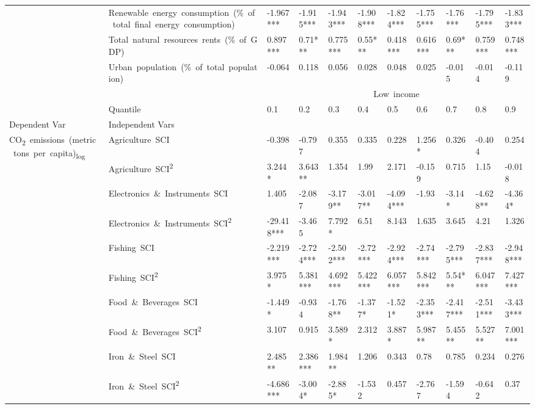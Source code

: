 \documentclass[10pt]{article}
\begin{document}
\begin{table}[H]
\begin{adjustbox}{width=\textwidth,center}
\begin{tabular}{lllllllllll}
      & Renewable\ energy\ consumption\ (\%\ of\ total\ final\ energy\ consumption) & -1.967*** & -1.915*** & -1.943*** & -1.908*** & -1.824*** & -1.755*** & -1.76*** & -1.795*** & -1.833*** \\
      & Total\ natural\ resources\ rents\ (\%\ of\ GDP) & 0.897*** & 0.71*** & 0.775*** & 0.55*** & 0.418*** & 0.616*** & 0.69*** & 0.759*** & 0.748*** \\
      & Urban\ population\ (\%\ of\ total\ population) & -0.064 & 0.118 & 0.056 & 0.028 & 0.048 & 0.025 & -0.015 & -0.014 & -0.119 \\
       \toprule
            &  & \multicolumn{9}{c}{Low\ income} \\
            & Quantile & 0.1 & 0.2 & 0.3 & 0.4 & 0.5 & 0.6 & 0.7 & 0.8 & 0.9 \\
      Dependent Var & Independent Vars &  &  &  &  &  &  &  &  &  \\
      \midrule
      \multirow[t]{31}{*}{CO\textsubscript{2}\ emissions\ (metric\ tons\ per\ capita)\textsubscript{log}} & Agriculture\ SCI & -0.398 & -0.797 & 0.355 & 0.335 & 0.228 & 1.256* & 0.326 & -0.404 & 0.254 \\
      & Agriculture\ SCI\textsuperscript{2} & 3.244* & 3.643** & 1.354 & 1.99 & 2.171 & -0.159 & 0.715 & 1.15 & -0.018 \\
      & Electronics\ \&\ Instruments\ SCI & 1.405 & -2.087 & -3.179** & -3.017** & -4.094*** & -1.93 & -3.14* & -4.628** & -4.364* \\
      & Electronics\ \&\ Instruments\ SCI\textsuperscript{2} & -29.418*** & -3.465 & 7.792* & 6.51 & 8.143 & 1.635 & 3.645 & 4.21 & 1.326 \\
      & Fishing\ SCI & -2.219*** & -2.724*** & -2.502*** & -2.72*** & -2.924*** & -2.74*** & -2.795*** & -2.837*** & -2.948*** \\
      & Fishing\ SCI\textsuperscript{2} & 3.975* & 5.381*** & 4.692*** & 5.422*** & 6.057*** & 5.842*** & 5.54*** & 6.047*** & 7.427*** \\
      & Food\ \&\ Beverages\ SCI & -1.449* & -0.934 & -1.768** & -1.377* & -1.521* & -2.353*** & -2.417*** & -2.511*** & -3.433*** \\
      & Food\ \&\ Beverages\ SCI\textsuperscript{2} & 3.107 & 0.915 & 3.589* & 2.312 & 3.887* & 5.987** & 5.455** & 5.527** & 7.001*** \\
      & Iron\ \&\ Steel\ SCI & 2.485** & 2.386*** & 1.984** & 1.206 & 0.343 & 0.78 & 0.785 & 0.234 & 0.276 \\
      & Iron\ \&\ Steel\ SCI\textsuperscript{2} & -4.686*** & -3.004* & -2.885* & -1.532 & 0.457 & -2.767 & -1.594 & -0.642 & 0.37 \\

\end{tabular}
\end{adjustbox}
\end{table}
\end{document}
